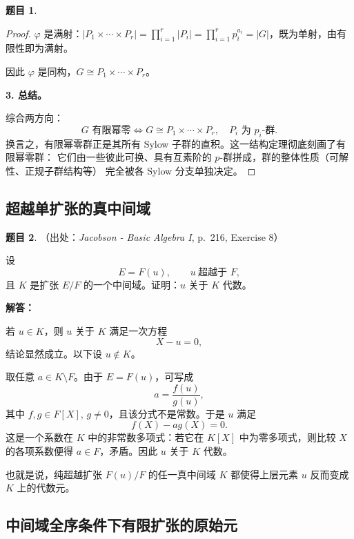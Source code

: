 \documentclass[a4paper]{ctexart}
\theoremstyle{definition}
\newtheorem{example}{题目}[section]
\theoremstyle{analysis}
\theoremstyle{plain}
\begin{document}
\begin{example}
\begin{proof}
\(\varphi\) 是满射：\(|\!P_1\times\cdots\times P_r|=\prod_{i=1}^r|P_i|
=\prod_{i=1}^r p_i^{a_i}=|G|\)，既为单射，由有限性即为满射。

因此 \(\varphi\) 是同构，\(G\cong P_1\times\cdots\times P_r\)。

\textbf{3. 总结。}

综合两方向：
\[
  G\text{ 有限幂零}
  \iff
  G\cong P_1\times\cdots\times P_r,\quad P_i\text{ 为 }p_i\text{-群}.
\]
换言之，有限幂零群正是其所有 Sylow 子群的直积。这一结构定理彻底刻画了有限幂零群：
它们由一些彼此可换、具有互素阶的 \(p\)-群拼成，群的整体性质（可解性、正规子群结构等）
完全被各 Sylow 分支单独决定。
\end{proof}
\end{example}

\subsection{超越单扩张的真中间域}\label{subsec:problem-transcendental-simple}

\begin{example}
（出处：\textit{Jacobson - Basic Algebra I}, p.~216, Exercise 8）

设
\[
  E=F(u),\qquad u\ \text{超越于 }F,
\]
且 \(K\) 是扩张 \(E/F\) 的一个中间域。证明：\(u\) 关于 \(K\) 代数。

\textbf{解答：}

若 \(u\in K\)，则 \(u\) 关于 \(K\) 满足一次方程
\[
  X-u=0,
\]
结论显然成立。以下设 \(u\notin K\)。

取任意 \(a\in K\setminus F\)。由于 \(E=F(u)\)，可写成
\[
  a=\frac{f(u)}{g(u)},
\]
其中 \(f,g\in F[X]\), \(g\neq 0\)，且该分式不是常数。于是 \(u\) 满足
\[
  f(X)-ag(X)=0.
\]
这是一个系数在 \(K\) 中的非常数多项式：若它在 \(K[X]\) 中为零多项式，则比较 \(X\) 的各项系数便得 \(a\in F\)，矛盾。因此 \(u\) 关于 \(K\) 代数。

也就是说，纯超越扩张 \(F(u)/F\) 的任一真中间域 \(K\) 都使得上层元素 \(u\) 反而变成 \(K\) 上的代数元。
\end{example}

\subsection{中间域全序条件下有限扩张的原始元}\label{subsec:problem-primitive-element-chain}
\end{document}
